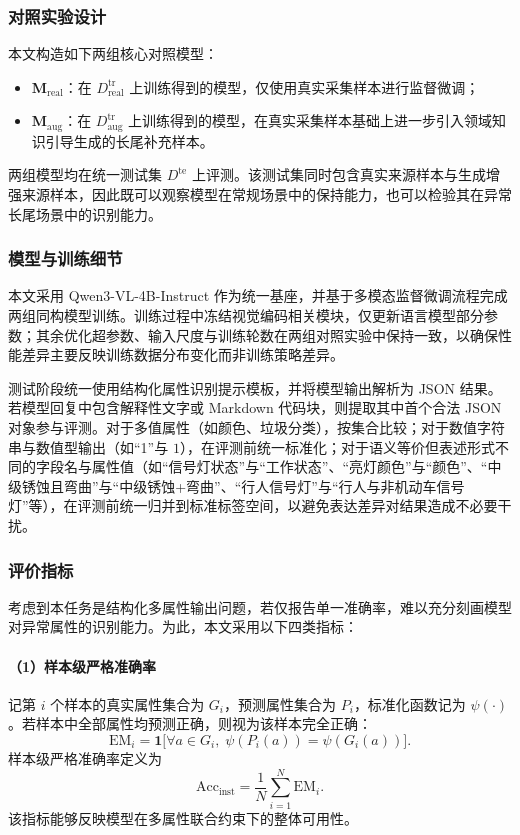 \subsubsection{对照实验设计}

本文构造如下两组核心对照模型：
\begin{itemize}
    \item \textbf{M$_{\mathrm{real}}$}：在 $D_{\mathrm{real}}^{\mathrm{tr}}$ 上训练得到的模型，仅使用真实采集样本进行监督微调；
    \item \textbf{M$_{\mathrm{aug}}$}：在 $D_{\mathrm{aug}}^{\mathrm{tr}}$ 上训练得到的模型，在真实采集样本基础上进一步引入领域知识引导生成的长尾补充样本。
\end{itemize}

两组模型均在统一测试集 $D^{\mathrm{te}}$ 上评测。该测试集同时包含真实来源样本与生成增强来源样本，因此既可以观察模型在常规场景中的保持能力，也可以检验其在异常长尾场景中的识别能力。

\subsubsection{模型与训练细节}

本文采用 Qwen3-VL-4B-Instruct 作为统一基座，并基于多模态监督微调流程完成两组同构模型训练。训练过程中冻结视觉编码相关模块，仅更新语言模型部分参数；其余优化超参数、输入尺度与训练轮数在两组对照实验中保持一致，以确保性能差异主要反映训练数据分布变化而非训练策略差异。

测试阶段统一使用结构化属性识别提示模板，并将模型输出解析为 JSON 结果。若模型回复中包含解释性文字或 Markdown 代码块，则提取其中首个合法 JSON 对象参与评测。对于多值属性（如颜色、垃圾分类），按集合比较；对于数值字符串与数值型输出（如“1”与 $1$），在评测前统一标准化；对于语义等价但表述形式不同的字段名与属性值（如“信号灯状态”与“工作状态”、“亮灯颜色”与“颜色”、“中级锈蚀且弯曲”与“中级锈蚀+弯曲”、“行人信号灯”与“行人与非机动车信号灯”等），在评测前统一归并到标准标签空间，以避免表达差异对结果造成不必要干扰。

\subsubsection{评价指标}

考虑到本任务是结构化多属性输出问题，若仅报告单一准确率，难以充分刻画模型对异常属性的识别能力。为此，本文采用以下四类指标：

\paragraph{（1）样本级严格准确率}
记第 $i$ 个样本的真实属性集合为 $G_i$，预测属性集合为 $P_i$，标准化函数记为 $\psi(\cdot)$。若样本中全部属性均预测正确，则视为该样本完全正确：
\[
\mathrm{EM}_i = \mathbf{1}\big[\forall a\in G_i,\; \psi(P_i(a))=\psi(G_i(a))\big].
\]
样本级严格准确率定义为
\[
\mathrm{Acc}_{\mathrm{inst}} = \frac{1}{N}\sum_{i=1}^{N}\mathrm{EM}_i.
\]
该指标能够反映模型在多属性联合约束下的整体可用性。

